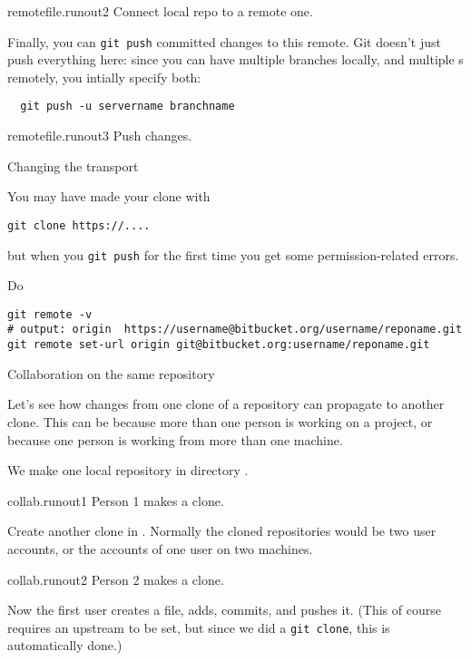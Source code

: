 \begin{gitstep}{remotefile.runout2}
  Connect local repo to a remote one.
\end{gitstep}

Finally, you can \lstinline{git push} committed changes to this remote.
Git doesn't just push everything here: since you can have multiple branches locally,
and multiple s remotely, you intially specify both:
\begin{lstlisting}
  git push -u servername branchname
\end{lstlisting}

\begin{gitstep}{remotefile.runout3}
  Push changes.
\end{gitstep}

\newpage
{} {Changing the transport}

You may have made your clone with
\begin{verbatim}
git clone https://....
\end{verbatim}
but when you \lstinline{git push} for the first time
you get some permission-related errors.

Do
\begin{verbatim}
git remote -v
# output: origin  https://username@bitbucket.org/username/reponame.git
git remote set-url origin git@bitbucket.org:username/reponame.git
\end{verbatim}

\newpage
{} {Collaboration on the same repository}

Let's see how changes from one clone of a repository
can propagate to another clone.
This can be because more than one person is working on a project,
or because one person is working from more than one machine.

We make one local repository in directory .

\begin{gitstep}{collab.runout1}
  Person 1 makes a clone.
\end{gitstep}

Create another clone in .
Normally the cloned repositories would be two user accounts,
or the accounts of one user on two machines.

\begin{gitstep}{collab.runout2}
  Person 2 makes a clone.
\end{gitstep}

Now the first user creates a file, adds, commits, and pushes it.
(This of course requires an upstream to be set,
but since we did a \lstinline{git clone},
this is automatically done.)

